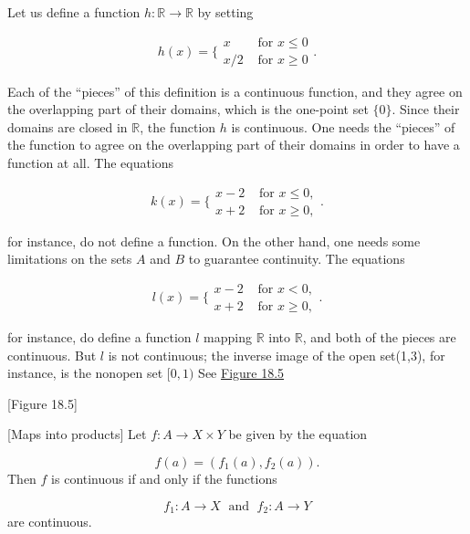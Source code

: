 \begin{centeredblock*}
\begin{example}
\label{ex:\thesection.\theexample}
 Let us define a function \(h : \mathbb{R} \rightarrow \mathbb{R}\) by setting

 \[
 h(x) = \{ \begin{array}{ll} x & \text{ for }x \leq 0 \\ x/2 & \text{ for }x \geq 0 \end{array}.
 \]

 Each of the ``pieces'' of this definition is a continuous function, and they agree on the overlapping part of their domains, which is the one-point set \(\{ 0\}\). Since their domains are closed in \(\mathbb{R}\), the function \(h\) is continuous. One needs the ``pieces'' of the function to agree on the overlapping part of their domains in order to have a function at all. The equations

 \[
 k(x) = \{ \begin{array}{ll} x - 2 & \text{ for }x \leq 0, \\ x + 2 & \text{ for }x \geq 0, \end{array}.
 \]

 for instance, do not define a function. On the other hand, one needs some limitations on the sets \(A\) and \(B\) to guarantee continuity. The equations

 \[
 l(x) = \{ \begin{array}{ll} x - 2 & \text{ for }x < 0, \\ x + 2 & \text{ for }x \geq 0, \end{array}.
 \]

 for instance, do define a function \(l\) mapping \(\mathbb{R}\) into \(\mathbb{R}\), and both of the pieces are continuous. But \(l\) is not continuous; the inverse image of the open set(1,3), for instance, is the nonopen set \(\lbrack 0,1)\) See \hyperref[fig:18.5]{Figure 18.5}

 [Figure 18.5]
\end{example}
\end{centeredblock*}

\begin{theorem}
\label{thm:\thetheorem}[Maps into products]
 Let \(f : A \rightarrow X \times Y\) be given by the equation

 \[
 f( a) = ( {f_{1}( a),f_{2}( a) }).
 \]
 Then \(f\) is continuous if and only if the functions

 \[
 f_{1} : A \rightarrow X\;\text{ and }\;f_{2} : A \rightarrow Y
 \]
 are continuous.
\end{theorem}

